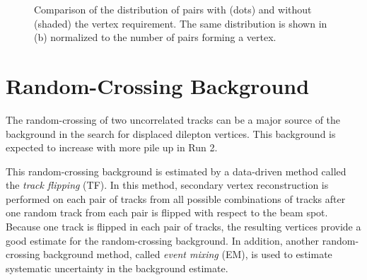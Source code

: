 \begin{figure}[!htb]
    \centering
    \label{fig:cosmicCR} 
	\caption{Comparison of the \Rcr distribution of \mumu pairs with (dots) and without (shaded) the vertex requirement. The same distribution is shown in (b) normalized to the number of \mumu pairs forming a vertex.}
\end{figure}



\section{Random-Crossing Background}
\label{sec:bkg:random}

The random-crossing of two uncorrelated tracks can be a major source of the background in the search for displaced dilepton vertices. This background is expected to increase with more pile up in Run 2.
 
This random-crossing background is estimated by a data-driven method called the \textit{track flipping} (TF). In this method, secondary vertex reconstruction is performed on each pair of tracks from all possible combinations of tracks after one random track from each pair is flipped with respect to the beam spot. Because one track is flipped in each pair of tracks, the resulting vertices provide a good estimate for the random-crossing background. In addition, another random-crossing background method, called \textit{event mixing} (EM), is used to estimate systematic uncertainty in the background estimate.

